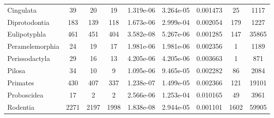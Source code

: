 \begin{table}
{\begin{tabular}{lcccccccc}
		   Cingulata &         39 &          20 &          19 &  1.319e-06 &  3.264e-05 &      0.001473 &            25 &          1117 \\
	   Diprotodontia &        183 &         139 &         118 &  1.673e-06 &  2.999e-04 &      0.002054 &           179 &          1227 \\
		Eulipotyphla &        461 &         451 &         404 &  3.582e-08 &  5.267e-06 &      0.001285 &           147 &         35865 \\
	 Peramelemorphia &         24 &          19 &          17 &  1.981e-06 &  1.981e-06 &      0.002356 &             1 &          1189 \\
	  Perissodactyla &         29 &          16 &          13 &  4.205e-06 &  4.205e-06 &      0.003663 &             1 &           871 \\
			  Pilosa &         34 &          10 &           9 &  1.095e-06 &  9.465e-05 &      0.002282 &            86 &          2084 \\
			Primates &        430 &         407 &         337 &  1.238e-07 &  1.499e-05 &      0.002366 &           121 &         19101 \\
		 Proboscidea &         17 &           2 &           2 &  2.566e-06 &  1.253e-04 &      0.010165 &            49 &          3961 \\
			Rodentia &       2271 &        2197 &        1998 &  1.838e-08 &  2.944e-05 &      0.001101 &          1602 &         59905 \\
	\hline
	\end{tabular}}
	\end{table}
